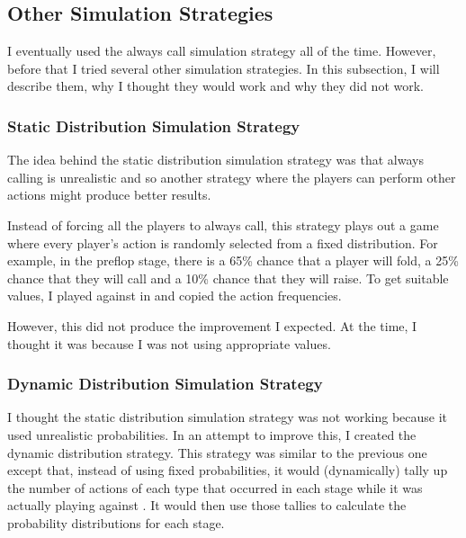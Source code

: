 \subsection{Other Simulation Strategies}			%


I eventually used the always call simulation strategy all of the time. However, before that I tried several other simulation strategies. In this subsection, I will describe them, why I thought they would work and why they did not work.


\subsubsection{Static Distribution Simulation Strategy}	%

The idea behind the static distribution simulation strategy was that always calling is unrealistic and so another strategy where the players can perform other actions might produce better results. 

Instead of forcing all the players to always call, this strategy plays out a game where every player's action is randomly selected from a fixed distribution. For example, in the preflop stage, there is a 65\% chance that a player will fold, a 25\% chance that they will call and a 10\% chance that they will raise. 
To get suitable values, I played \sbt against \sbt in \pap and copied the action frequencies.

However, this did not produce the improvement I expected. At the time, I thought it was because I was not using appropriate values. 


\subsubsection{Dynamic Distribution Simulation Strategy}%

I thought the static distribution simulation strategy was not working because it used unrealistic probabilities. In an attempt to improve this, I created the dynamic distribution strategy. This strategy was similar to the previous one except that, instead of using fixed probabilities, it would (dynamically) tally up the number of actions of each type that occurred in each stage while it was actually playing against \sbt. It would then use those tallies to calculate the probability distributions for each stage. 

